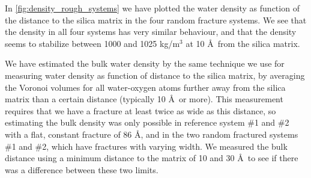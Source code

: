 In \cref{fig:density_rough_systems} we have plotted the water density as function of the distance to the silica matrix in the four random fracture systems. We see that the density in all four systems has very similar behaviour, and that the density seems to stabilize between 1000 and 1025 kg/m$^3$ at 10 \AA\ from the silica matrix.%
%
%
\begin{figure}[htpb]%
\setlength{\myfigwidth}{0.58\textwidth}%
\end{figure}%

We have estimated the bulk water density by the same technique we use for measuring water density as function of distance to the silica matrix, by averaging the Voronoi volumes for all water-oxygen atoms further away from the silica matrix than a certain distance (typically 10 \AA\ or more). This measurement requires that we have a fracture at least twice as wide as this distance, so estimating the bulk density was only possible in reference system \#1 and \#2 with a flat, constant fracture of 86 \AA, and in the two random fractured systems \#1 and \#2, which have fractures with varying width. We measured the bulk distance using a minimum distance to the matrix of 10 and 30 \AA\, to see if there was a difference between these two limits.

